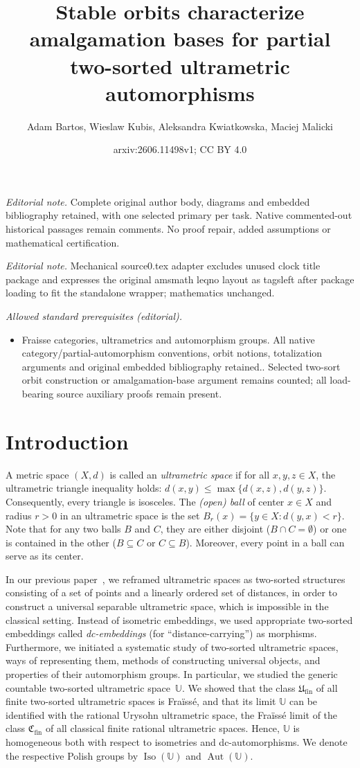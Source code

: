 \documentclass[10pt,a4paper]{article}
\title{Stable orbits characterize amalgamation bases for partial two-sorted ultrametric automorphisms}
\author{Adam Bartos, Wieslaw Kubis, Aleksandra Kwiatkowska, Maciej Malicki}
\date{arxiv:2606.11498v1; CC BY 4.0}
\theoremstyle{definition}
\theoremstyle{remark}
\newcommand \U {\mathbb{U}}
\newcommand \fin {{\operatorname{fin}}}
\newcommand \Ult {\mathfrak{U}}
\newcommand \Aut {\operatorname{Aut}}
\newcommand \Iso {\operatorname{Iso}}
\begin{document}
\maketitle
\noindent\textit{Editorial note.} Complete original author body, diagrams and embedded bibliography retained, with one selected primary per task. Native commented-out historical passages remain comments. No proof repair, added assumptions or mathematical certification.\par\medskip
\noindent\textit{Editorial note.} Mechanical source0.tex adapter excludes unused clock title package and expresses the original amsmath leqno layout as tagsleft after package loading to fit the standalone wrapper; mathematics unchanged.\par\medskip
\noindent\textit{Allowed standard prerequisites (editorial).}\begin{itemize}
\item Fraisse categories, ultrametrics and automorphism groups. All native category/partial-automorphism conventions, orbit notions, totalization arguments and original embedded bibliography retained.. Selected two-sort orbit construction or amalgamation-base argument remains counted; all load-bearing source auxiliary proofs remain present.
\end{itemize}\medskip
\section{Introduction}

A metric space $(X,d)$ is called an {\em ultrametric space} if for all $x,y,z\in X$, the ultrametric triangle inequality holds: $d(x,y)\leq\max\{d(x,z), d(y,z)\}$. 
Consequently, every triangle is isosceles.
The {\em (open) ball} of center $x\in X$ and radius $r>0$ in an ultrametric space is the set $B_r(x)=\{y\in X\colon d(y,x)<r\}$.
Note that for any two balls $B$ and $C$, they are either disjoint ($B\cap C=\emptyset$) or one is contained in the other ($B\subseteq C$ or $C\subseteq B$). Moreover, every point in a ball can serve as its center.

In our previous paper~\cite{paper1}, we reframed ultrametric spaces as two-sorted structures consisting of a set of points and a linearly ordered set of distances, in order to construct a universal separable ultrametric space, which is impossible in the classical setting.
Instead of isometric embeddings, we used appropriate two-sorted embeddings called \emph{dc-embeddings} (for “distance-carrying”) as morphisms.
Furthermore, we initiated a systematic study of two-sorted ultrametric spaces, ways of representing them, methods of constructing universal objects, and properties of their automorphism groups.
In particular, we studied the generic countable two-sorted ultrametric space~$\U$.
We showed that the class $\Ult_\fin$ of all finite two-sorted ultrametric spaces is Fraïssé, and that its limit $\U$ can be identified with the rational Urysohn ultrametric space, the Fraïssé limit of the class $\mathfrak{C}_\fin$ of all classical finite rational ultrametric spaces.
Hence, $\U$ is homogeneous both with respect to isometries and dc-automorphisms.
We denote the respective Polish groups by $\Iso(\U)$ and $\Aut(\U)$.
\end{document}
